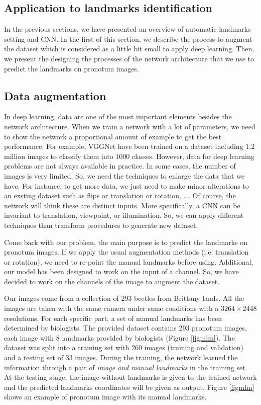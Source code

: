 \documentclass{article} %
\begin{document}
\begin{multicols}{2}
\section{Application to landmarks identification}
\label{SecApp}
In the previous sections, we have presented an overview of automatic landmarks setting and CNN. In the first of this section, we describe the process to augment the dataset which is considered as a little bit small to apply deep learning. Then, we present the designing the processes of the network architecture that we use to predict the landmarks on pronotum images.

\subsection{Data augmentation}
\label{Secdataaug}
In deep learning, data are one of the most important elements besides the network architecture. When we train a network with a lot of parameters, we need to show the network a proportional amount of example to get the best performance. For example, VGGNet \cite{simonyan2014very} have been trained on a dataset including $1.2$ million images to classify them into $1000$ classes. However, data for deep learning problems are not always available in practice. In some cases, the number of images is very limited. So,
we need the techniques to enlarge the data that we have. For instance, to get more data, we just need to make minor alterations to an exsting dataset such as flips or translation or rotation, \ldots. Of course, the network will think these are distinct inputs. More specifically, a CNN can be invariant to translation, viewpoint, or illumination. So, we can apply different techniques than transform procedures to generate new dataset.

Come back with our problem, the main purpose is to predict the landmarks on pronotum images. If we apply the usual augmentation methods (i.e. translation or rotation), we need to re-point the manual landmarks before using. Additional, our model has been designed to work on the input of a channel. So, we have decided to work on the channels of the image to augment the dataset.

Our images come from a collection of 293 beetles from Brittany lands. All the images are taken with the same camera under same conditions with a $3264 \times 2448$ resolutions. For each specific part, a set of manual landmarks has been determined by biologists. The provided dataset contains 293 pronotum images, each image with 8 landmarks provided by biologists (Figure \ref{figmlm}). The dataset was split into a training set with 260 images (training and validation) and a testing set of 33 images. During the training, the network learned the information through a pair of \textit{image and manual landmarks} in the training set. At the testing stage, the image without landmarks is given to the trained network and the predicted landmarks coordinates will be given as output. Figure \ref{figmlm} shows an example of pronotum image with its manual landmarks.


\end{multicols}
\end{document}
